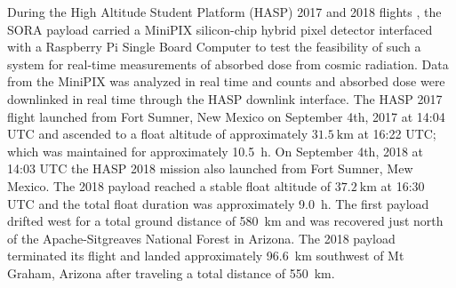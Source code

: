 During the High Altitude Student Platform (HASP) 2017 and 2018 flights \cite{hasp}, the SORA payload carried a MiniPIX silicon-chip hybrid pixel detector interfaced with a Raspberry Pi Single Board Computer to test the feasibility of such a system for real-time measurements of absorbed dose from cosmic radiation. Data from the MiniPIX was analyzed in real time and counts and absorbed dose were downlinked in real time through the HASP downlink interface. The HASP 2017 flight launched from Fort Sumner, New Mexico on September 4th, 2017 at 14:04 UTC and ascended to a float altitude of approximately $\SI{31.5}{\kilo\meter}$ at 16:22 UTC; which was maintained for approximately \SI{10.5}{\hour}. On September 4th, 2018 at 14:03 UTC the HASP 2018 mission also launched from Fort Sumner, Mew Mexico.  The 2018 payload reached a stable float altitude of $\SI{37.2}{\kilo\meter}$ at 16:30 UTC and the total float duration was approximately \SI{9.0}{\hour}. The first payload drifted west for a total ground distance of \SI{580}{\kilo\meter} and was recovered just north of the Apache-Sitgreaves National Forest in Arizona. The 2018 payload terminated its flight and landed approximately \SI{96.6}{\kilo\meter} southwest of Mt Graham, Arizona after traveling a total distance of \SI{550}{\kilo\meter}.
%
%
%
%
%
%
%
%
%

